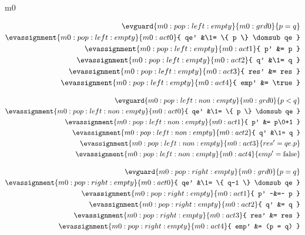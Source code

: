 \documentclass[12pt]{amsart}
\begin{document}
\begin{machine}{m0}

\begin{align*}
\evguard{m0:pop:left:empty}{m0:grd0}
	{ p = q }
\\ \evassignment{m0:pop:left:empty}{m0:act0}
	{ qe' &\1= \{ p \} \domsub qe }
\\ \evassignment{m0:pop:left:empty}{m0:act1}
	{ p' &= p }
\\ \evassignment{m0:pop:left:empty}{m0:act2}
	{ q' &\1= q }
\\ \evassignment{m0:pop:left:empty}{m0:act3}
	{ res' &= res }
\\ \evassignment{m0:pop:left:empty}{m0:act4}
	{ emp' &= \true }
\end{align*}


\begin{align*}
\evguard{m0:pop:left:non:empty}{m0:grd0}
	{ p < q }
\\ \evassignment{m0:pop:left:non:empty}{m0:act0}
	{ qe' &\1= \{ p \} \domsub qe }
\\ \evassignment{m0:pop:left:non:empty}{m0:act1}
	{ p' &= p\0+1 }
\\ \evassignment{m0:pop:left:non:empty}{m0:act2}
	{ q' &\1= q }
\\ \evassignment{m0:pop:left:non:empty}{m0:act3}
	{ res' = qe.p }
\\ \evassignment{m0:pop:left:non:empty}{m0:act4}
	{ emp' = \false }
\end{align*}



\begin{align*}
\evguard{m0:pop:right:empty}{m0:grd0}
	{ p = q }
\\ \evassignment{m0:pop:right:empty}{m0:act0}
	{ qe' &\1= \{ q-1 \} \domsub qe }
\\ \evassignment{m0:pop:right:empty}{m0:act1}
	{ p' ~&=~ p }
\\ \evassignment{m0:pop:right:empty}{m0:act2}
	{ q' &= q }
\\ \evassignment{m0:pop:right:empty}{m0:act3}
	{ res' &= res }
\\ \evassignment{m0:pop:right:empty}{m0:act4}
	{ emp' &= (p = q) }
\end{align*}



\end{machine}
\end{document}

